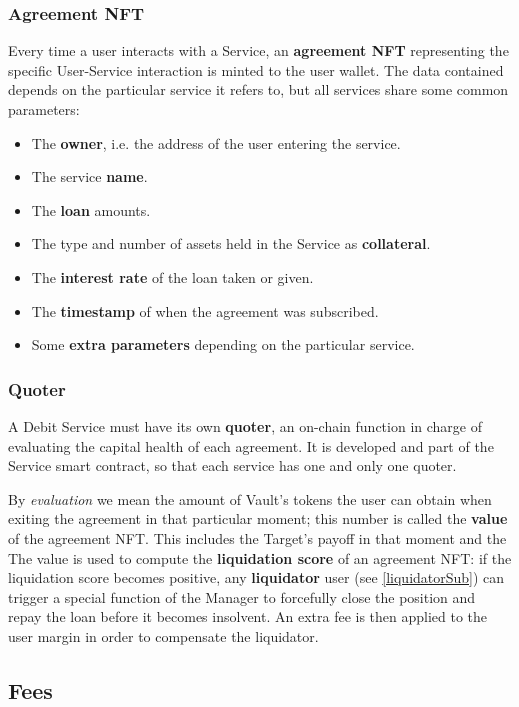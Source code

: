 \documentclass[a4paper,10 pt]{article}
\theoremstyle{definition}
\begin{document}
\subsubsection{Agreement NFT}\label{posNftSubSub}

Every time a user interacts with a Service, an {\bf agreement NFT} representing the specific User-Service interaction is minted to the user wallet. The data contained depends on the particular service it refers to, but all services share some common parameters:
\begin{itemize}
\item The {\bf owner}, i.e. the address of the user entering the service.
\item The service {\bf name}.
\item The {\bf loan} amounts.
\item The type and number of assets held in the Service as {\bf collateral}.
\item The {\bf interest rate} of the loan taken or given.
\item The {\bf timestamp} of when the agreement was subscribed.
\item Some {\bf extra parameters} depending on the particular service.
\end{itemize}

\subsubsection{Quoter}\label{quoterSubSub}
A Debit Service must have its own {\bf quoter}, an on-chain function in charge of evaluating the capital health of each agreement. It is developed and part of the Service smart contract, so that each service has one and only one quoter.

By {\it evaluation} we mean the amount of Vault's tokens the user can obtain when exiting the agreement in that particular moment; this number is called the {\bf value} of the agreement NFT. This includes the Target's payoff in that moment and the  The value is used to compute the {\bf liquidation score} of an agreement NFT: if the liquidation score becomes positive, any {\bf liquidator} user (see \ref{liquidatorSub}) can trigger a special function of the Manager to forcefully close the position and repay the loan before it becomes insolvent. An extra fee is then applied to the user margin in order to compensate the liquidator.

\subsection{Fees}\label{feeSub}
\end{document}
